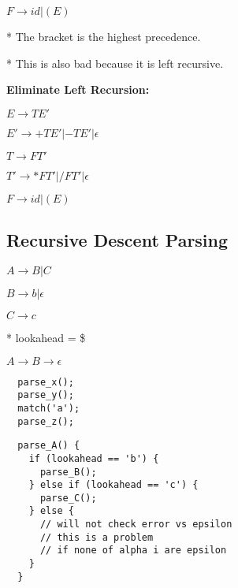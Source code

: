 \documentclass[twocolumn]{article}
\begin{document}
$F \to id | (E)$

* The bracket is the highest precedence.

* This is also bad because it is left recursive.

\textbf{Eliminate Left Recursion:}

$E \to TE'$

$E' \to + TE' | - TE' | \mathcal{\epsilon}$

$T \to FT'$

$T' \to * FT' | / FT' | \mathcal{\epsilon}$

$F \to id | (E)$


\subsection{Recursive Descent Parsing}

$A \to B | C$

$B \to b | \epsilon$

$C \to c$

* lookahead = \$

$A \to B \to \epsilon$

\begin{verbatim}
  parse_x();
  parse_y();
  match('a');
  parse_z();
\end{verbatim}

\newpage

\begin{verbatim}
  parse_A() {
    if (lookahead == 'b') {
      parse_B();
    } else if (lookahead == 'c') {
      parse_C();
    } else {
      // will not check error vs epsilon
      // this is a problem
      // if none of alpha i are epsilon
    }
  }
\end{verbatim}
\end{document}
